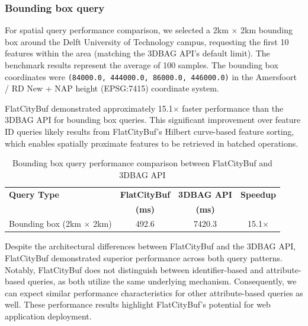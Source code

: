 \subsubsection{Bounding box query}
\label{result:benchmark_over_the_web:bounding_box_query}

For spatial query performance comparison, we selected a 2km $\times$ 2km bounding box around the Delft University of Technology campus, requesting the first 10 features within the area (matching the 3DBAG API's default limit). The benchmark results represent the average of 100 samples. The bounding box coordinates were \texttt{(84000.0, 444000.0, 86000.0, 446000.0)} in the Amersfoort / RD New + NAP height (EPSG:7415) coordinate system.

FlatCityBuf demonstrated approximately 15.1$\times$ faster performance than the 3DBAG API for bounding box queries. This significant improvement over feature ID queries likely results from FlatCityBuf's Hilbert curve-based feature sorting, which enables spatially proximate features to be retrieved in batched operations.

\begin{table}[ht]
  \centering
  \caption{Bounding box query performance comparison between FlatCityBuf and 3DBAG API}
  \label{tab:bounding_box_performance}
  \begin{tabular}{lccc}
    \toprule
    \textbf{Query Type} & \textbf{FlatCityBuf} & \textbf{3DBAG API} & \textbf{Speedup} \\
    & \textbf{(ms)} & \textbf{(ms)} & \\
    \midrule
    Bounding box (2km $\times$ 2km) & 492.6 & 7420.3 & 15.1$\times$ \\
    \bottomrule
  \end{tabular}
\end{table}

Despite the architectural differences between FlatCityBuf and the 3DBAG API, FlatCityBuf demonstrated superior performance across both query patterns. Notably, FlatCityBuf does not distinguish between identifier-based and attribute-based queries, as both utilize the same underlying mechanism. Consequently, we can expect similar performance characteristics for other attribute-based queries as well. These performance results highlight FlatCityBuf's potential for web application deployment.